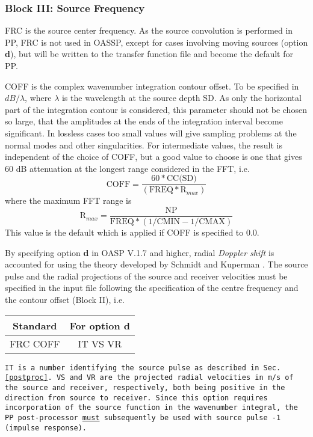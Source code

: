 \subsubsection{Block III: Source Frequency}

FRC is the source center frequency. As the source convolution is
performed in PP,  FRC is not used in OASSP, except for cases involving
moving sources (option {\bf d}), but will be written to the
transfer function file and become the default for PP.

COFF is the complex wavenumber
integration 
contour offset. To be specified in
		$dB/\lambda$, where $\lambda$ is the wavelength at the source 
		depth SD. As only the horizontal part of
		the integration contour is considered, this parameter
		should not be chosen so large, that the amplitudes
		at the ends of the integration interval become 
		significant. In lossless cases too small values
		will give sampling problems at the normal modes
		and other singularities. For intermediate values,
		the result is independent of the choice of COFF,
		but a good value to choose is one that gives 60 dB
		attenuation at the longest range considered in the FFT, i.e.
                \begin{displaymath}
		\mbox{COFF} = \frac{60 \ast \mbox{CC(SD)}}{( \mbox{FREQ} \ast \mbox{R}_{max} )}
		\end{displaymath} 
       		where the maximum FFT range is
       		\begin{displaymath}
		\mbox{R}_{max} = \frac{\mbox{NP}}{\mbox{FREQ}\ast(1/\mbox{CMIN} - 1/\mbox{CMAX})}
		\end{displaymath}
		This value is the default which is applied if COFF
		is specified to 0.0.


By specifying option {\bf d} in OASP V.1.7 and higher,
radial {\em Doppler shift} is accounted for 
using the theory developed by Schmidt and Kuperman
\cite{sk:jasa94}.  The source pulse and the radial projections of the
source and  receiver velocities must be specified in the input file
following the specification of the centre frequency and the contour
offset (Block II), i.e.

\begin{tabular}{cc}
   Standard   &    For option {\bf d} \\ \hline
FRC COFF & IT VS VR
\end{tabular}


\tt IT \rm is a number identifying the source pulse as described
in Sec.\,\ref{postproc}. \tt VS \rm and \tt VR \rm are the
projected radial velocities in m/s of the source and receiver, respectively,
both being positive in the direction from source to receiver.
Since this option requires incorporation of the
source function in the wavenumber integral, the PP post-processor
\underline{must} subsequently be used with source pulse -1 (impulse response).



